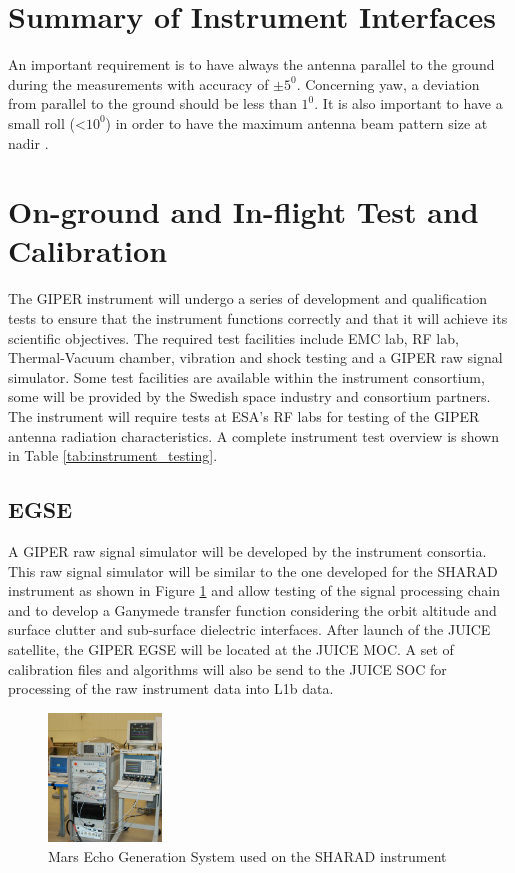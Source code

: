 \section{Summary of Instrument Interfaces}
An important requirement is to have always the antenna parallel to the ground during the measurements with accuracy of $\pm 5^{0}$. Concerning yaw, a deviation from parallel to the ground should be less than $1^{0}$. It is also important to have a small roll (<$ 10^{0}$) in order to have the maximum antenna beam pattern size at nadir \cite{yellowbook}.
%
\section{On-ground and In-flight Test and Calibration}
%
The \ac{GIPER} instrument will undergo a series of development and qualification tests to ensure that the instrument functions correctly and that it will achieve its scientific objectives. The required test facilities include \ac{EMC} lab, RF lab, Thermal-Vacuum chamber, vibration and shock testing and a \ac{GIPER} raw signal simulator. Some test facilities are available within the instrument consortium, some will be provided by the Swedish space industry and consortium partners. The instrument will require tests at ESA's \ac{RF} labs for testing of the \ac{GIPER} antenna radiation characteristics. A complete instrument test overview is shown in Table \ref{tab:instrument_testing}.
%
\subsection{EGSE}
A \ac{GIPER} raw signal simulator will be developed by the instrument consortia. This raw signal simulator will be similar to the one developed for the \ac{SHARAD} instrument\cite{Giovanni} as shown in Figure \ref{fig:MEGS} and allow testing of the signal processing chain and to develop a Ganymede transfer function considering the orbit altitude and surface clutter and sub-surface dielectric interfaces. After launch of the JUICE satellite, the \ac{GIPER} \ac{EGSE} will be located at the JUICE \ac{MOC}. A set of calibration files and algorithms will also be send to the JUICE \ac{SOC} for processing of the raw instrument data into L1b data.
%
\begin{figure}
\centering
\includegraphics[width=0.27\textwidth]{Figures/MEGS}
\caption[caption]{Mars Echo Generation System used on the SHARAD instrument\cite{MEGS}}
\label{fig:MEGS}
\end{figure}
%
